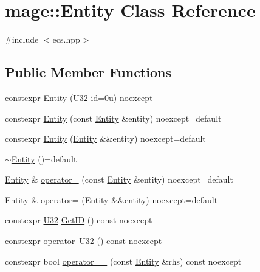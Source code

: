 \hypertarget{classmage_1_1_entity}{}\section{mage\+:\+:Entity Class Reference}
\label{classmage_1_1_entity}


{\ttfamily \#include $<$ecs.\+hpp$>$}

\subsection*{Public Member Functions}
\begin{DoxyCompactItemize}
\item 
constexpr \mbox{\hyperlink{classmage_1_1_entity_a52d3874de76f7397f40d7c6c435a634e}{Entity}} (\mbox{\hyperlink{namespacemage_aa5d6eaabaac3cdd01873d6a3d27e90f3}{U32}} id=0u) noexcept
\item 
constexpr \mbox{\hyperlink{classmage_1_1_entity_a6aecca3fac3d7a58bf8481c5db75d89e}{Entity}} (const \mbox{\hyperlink{classmage_1_1_entity}{Entity}} \&entity) noexcept=default
\item 
constexpr \mbox{\hyperlink{classmage_1_1_entity_a579488b3b2d97a806286dcce13f3ab9a}{Entity}} (\mbox{\hyperlink{classmage_1_1_entity}{Entity}} \&\&entity) noexcept=default
\item 
\mbox{\hyperlink{classmage_1_1_entity_ac12ef8e788def8f33fc9bb63dd3e6526}{$\sim$\+Entity}} ()=default
\item 
\mbox{\hyperlink{classmage_1_1_entity}{Entity}} \& \mbox{\hyperlink{classmage_1_1_entity_abaf86e29f4fef924f4aa704db1a67482}{operator=}} (const \mbox{\hyperlink{classmage_1_1_entity}{Entity}} \&entity) noexcept=default
\item 
\mbox{\hyperlink{classmage_1_1_entity}{Entity}} \& \mbox{\hyperlink{classmage_1_1_entity_ab9348933892f8134186b9adc1431ba43}{operator=}} (\mbox{\hyperlink{classmage_1_1_entity}{Entity}} \&\&entity) noexcept=default
\item 
constexpr \mbox{\hyperlink{namespacemage_aa5d6eaabaac3cdd01873d6a3d27e90f3}{U32}} \mbox{\hyperlink{classmage_1_1_entity_a50f8ec2e424e3677c6686b8545d82808}{Get\+ID}} () const noexcept
\item 
constexpr \mbox{\hyperlink{classmage_1_1_entity_ab79e38d311acf3d734f1e944ccab6404}{operator U32}} () const noexcept
\item 
constexpr bool \mbox{\hyperlink{classmage_1_1_entity_a432270050f461ed19d5f82ab2dba2333}{operator==}} (const \mbox{\hyperlink{classmage_1_1_entity}{Entity}} \&rhs) const noexcept

\end{DoxyCompactItemize}
